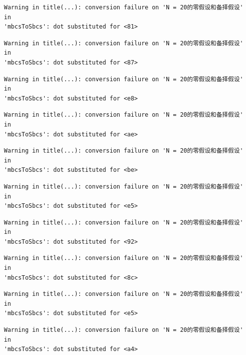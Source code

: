 \documentclass[
  letterpaper,
  DIV=11,
  numbers=noendperiod]{scrreprt}
\begin{document}
\begin{verbatim}
Warning in title(...): conversion failure on 'N = 20的零假设和备择假设' in
'mbcsToSbcs': dot substituted for <81>
\end{verbatim}

\begin{verbatim}
Warning in title(...): conversion failure on 'N = 20的零假设和备择假设' in
'mbcsToSbcs': dot substituted for <87>
\end{verbatim}

\begin{verbatim}
Warning in title(...): conversion failure on 'N = 20的零假设和备择假设' in
'mbcsToSbcs': dot substituted for <e8>
\end{verbatim}

\begin{verbatim}
Warning in title(...): conversion failure on 'N = 20的零假设和备择假设' in
'mbcsToSbcs': dot substituted for <ae>
\end{verbatim}

\begin{verbatim}
Warning in title(...): conversion failure on 'N = 20的零假设和备择假设' in
'mbcsToSbcs': dot substituted for <be>
\end{verbatim}

\begin{verbatim}
Warning in title(...): conversion failure on 'N = 20的零假设和备择假设' in
'mbcsToSbcs': dot substituted for <e5>
\end{verbatim}

\begin{verbatim}
Warning in title(...): conversion failure on 'N = 20的零假设和备择假设' in
'mbcsToSbcs': dot substituted for <92>
\end{verbatim}

\begin{verbatim}
Warning in title(...): conversion failure on 'N = 20的零假设和备择假设' in
'mbcsToSbcs': dot substituted for <8c>
\end{verbatim}

\begin{verbatim}
Warning in title(...): conversion failure on 'N = 20的零假设和备择假设' in
'mbcsToSbcs': dot substituted for <e5>
\end{verbatim}

\begin{verbatim}
Warning in title(...): conversion failure on 'N = 20的零假设和备择假设' in
'mbcsToSbcs': dot substituted for <a4>
\end{verbatim}
\end{document}
